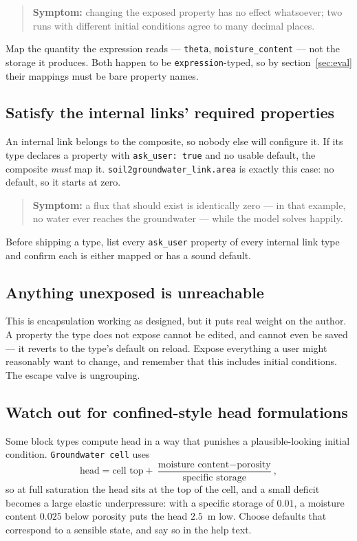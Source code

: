 \documentclass[11pt,a4paper]{article}
\newcommand{\code}[1]{\texttt{\small #1}}
\begin{document}
\begin{quote}
\textbf{Symptom:} changing the exposed property has no effect whatsoever; two
runs with different initial conditions agree to many decimal places.
\end{quote}

\noindent
Map the quantity the expression reads --- \code{theta},
\code{moisture\_content} --- not the storage it produces. Both happen to be
\code{expression}-typed, so by section~\ref{sec:eval} their mappings must be
bare property names.

\subsection{Satisfy the internal links' required properties}\label{sec:internalreq}

An internal link belongs to the composite, so nobody else will configure it. If
its type declares a property with \code{ask\_user: true} and no usable default,
the composite \emph{must} map it. \code{soil2groundwater\_link.area} is exactly
this case: no default, so it starts at zero.

\begin{quote}
\textbf{Symptom:} a flux that should exist is identically zero --- in that
example, no water ever reaches the groundwater --- while the model solves
happily.
\end{quote}

\noindent
Before shipping a type, list every \code{ask\_user} property of every internal
link type and confirm each is either mapped or has a sound default.

\subsection{Anything unexposed is unreachable}

This is encapsulation working as designed, but it puts real weight on the
author. A property the type does not expose cannot be edited, and cannot even
be saved --- it reverts to the type's default on reload. Expose everything a
user might reasonably want to change, and remember that this includes initial
conditions. The escape valve is ungrouping.

\subsection{Watch out for confined-style head formulations}

Some block types compute head in a way that punishes a plausible-looking
initial condition. \code{Groundwater cell} uses
\[
  \text{head} = \text{cell top} +
  \frac{\text{moisture content} - \text{porosity}}{\text{specific storage}},
\]
so at full saturation the head sits at the top of the cell, and a small deficit
becomes a large elastic underpressure: with a specific storage of $0.01$, a
moisture content $0.025$ below porosity puts the head $2.5$~m low. Choose
defaults that correspond to a sensible state, and say so in the help text.
\end{document}

